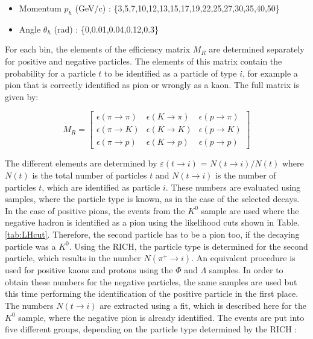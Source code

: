 \begin{itemize}
  \item Momentum $p_h$ (GeV/c) : \{3,5,7,10,12,13,15,17,19,22,25,27,30,35,40,50\}
  \item Angle $\theta_h$ (rad) : \{0,0.01,0.04,0.12,0.3\}
\end{itemize}

For each bin, the elements of the efficiency matrix $M_R$ are determined separately for positive and negative particles. The elements of this matrix contain the probability for a particle $t$ to be identified as a particle of type $i$, for example a pion that is correctly identified as pion or wrongly as a kaon. The full matrix is given by:

\begin{equation}
  M_R
  =
  \begin{bmatrix}
  \epsilon(\pi \rightarrow \pi) & \epsilon(K \rightarrow \pi) & \epsilon(p \rightarrow \pi)\\
  \epsilon(\pi \rightarrow K) & \epsilon(K \rightarrow K) & \epsilon(p \rightarrow K) \\
  \epsilon(\pi \rightarrow p) & \epsilon(K \rightarrow p) & \epsilon(p \rightarrow p)
  \end{bmatrix}
\end{equation}

The different elements are determined by $\varepsilon(t \rightarrow i)$ = $N(t \rightarrow i)/N(t)$ where $N(t)$ is the total number of particles $t$ and $N(t \rightarrow i)$ is the number of particles $t$, which are identified as particle $i$. These numbers are evaluated using samples, where the particle type is known, as in the case of the selected decays. In the case of positive pions, the events from the $K^0$ sample are used where the negative hadron is identified as a pion using the likelihood cuts shown in Table. \ref{tab:LHcut}.  Therefore, the second particle has to be a pion too, if the decaying particle was a $K^0$. Using the RICH, the particle type is determined for the second particle, which  results in the number $N(\pi^+ \rightarrow i)$. An equivalent procedure is used for positive kaons and protons using the $\Phi$ and $\Lambda$ samples. In order to obtain these numbers for the negative particles, the same samples are used but this time performing the identification of the positive particle in the first place. The numbers $N(t \rightarrow i)$ are extracted using a fit, which is described here for the $K^0$ sample, where the negative pion is already identified. The events are put into five different groups, depending on the particle type determined by the RICH :

